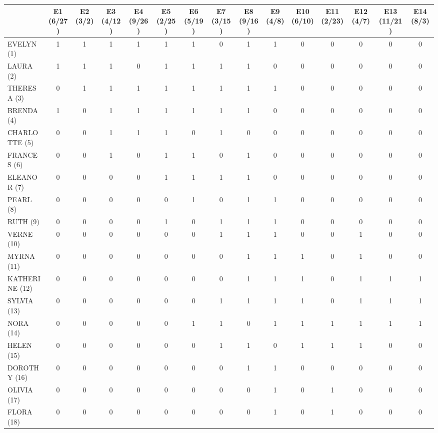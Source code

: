 \begin{table}
\centering\begingroup\fontsize{8}{10}\selectfont

\begin{tabular}[t]{lcccccccccccccc}
\toprule
  & E1 (6/27) & E2 (3/2) & E3 (4/12) & E4 (9/26) & E5 (2/25) & E6 (5/19) & E7 (3/15) & E8 (9/16) & E9 (4/8) & E10 (6/10) & E11 (2/23) & E12 (4/7) & E13 (11/21) & E14 (8/3)\\
\midrule
EVELYN (1) & 1 & 1 & 1 & 1 & 1 & 1 & 0 & 1 & 1 & 0 & 0 & 0 & 0 & 0\\
LAURA (2) & 1 & 1 & 1 & 0 & 1 & 1 & 1 & 1 & 0 & 0 & 0 & 0 & 0 & 0\\
THERESA (3) & 0 & 1 & 1 & 1 & 1 & 1 & 1 & 1 & 1 & 0 & 0 & 0 & 0 & 0\\
BRENDA (4) & 1 & 0 & 1 & 1 & 1 & 1 & 1 & 1 & 0 & 0 & 0 & 0 & 0 & 0\\
CHARLOTTE (5) & 0 & 0 & 1 & 1 & 1 & 0 & 1 & 0 & 0 & 0 & 0 & 0 & 0 & 0\\
FRANCES (6) & 0 & 0 & 1 & 0 & 1 & 1 & 0 & 1 & 0 & 0 & 0 & 0 & 0 & 0\\
ELEANOR (7) & 0 & 0 & 0 & 0 & 1 & 1 & 1 & 1 & 0 & 0 & 0 & 0 & 0 & 0\\
PEARL (8) & 0 & 0 & 0 & 0 & 0 & 1 & 0 & 1 & 1 & 0 & 0 & 0 & 0 & 0\\
RUTH (9) & 0 & 0 & 0 & 0 & 1 & 0 & 1 & 1 & 1 & 0 & 0 & 0 & 0 & 0\\
VERNE (10) & 0 & 0 & 0 & 0 & 0 & 0 & 1 & 1 & 1 & 0 & 0 & 1 & 0 & 0\\
MYRNA (11) & 0 & 0 & 0 & 0 & 0 & 0 & 0 & 1 & 1 & 1 & 0 & 1 & 0 & 0\\
KATHERINE (12) & 0 & 0 & 0 & 0 & 0 & 0 & 0 & 1 & 1 & 1 & 0 & 1 & 1 & 1\\
SYLVIA (13) & 0 & 0 & 0 & 0 & 0 & 0 & 1 & 1 & 1 & 1 & 0 & 1 & 1 & 1\\
NORA (14) & 0 & 0 & 0 & 0 & 0 & 1 & 1 & 0 & 1 & 1 & 1 & 1 & 1 & 1\\
HELEN (15) & 0 & 0 & 0 & 0 & 0 & 0 & 1 & 1 & 0 & 1 & 1 & 1 & 0 & 0\\
DOROTHY (16) & 0 & 0 & 0 & 0 & 0 & 0 & 0 & 1 & 1 & 0 & 0 & 0 & 0 & 0\\
OLIVIA (17) & 0 & 0 & 0 & 0 & 0 & 0 & 0 & 0 & 1 & 0 & 1 & 0 & 0 & 0\\
FLORA (18) & 0 & 0 & 0 & 0 & 0 & 0 & 0 & 0 & 1 & 0 & 1 & 0 & 0 & 0\\
\bottomrule
\end{tabular}
\endgroup{}
\end{table}
